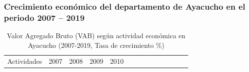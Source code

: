 \documentclass[
  jou,
  floatsintext,
  longtable,
  a4paper,
  nolmodern,
  notxfonts,
  notimes,
  12pt,
  colorlinks=true,linkcolor=blue,citecolor=blue,urlcolor=blue]{apa7}
\begin{document}
\subsubsection{Crecimiento económico del departamento de Ayacucho en el
periodo 2007 --
2019}\label{crecimiento-econuxf3mico-del-departamento-de-ayacucho-en-el-periodo-2007-2019}

\begin{ThreePartTable}

\begin{longtable}[]{@{}
  >{\raggedright\arraybackslash}p{}
  >{\raggedright\arraybackslash}p{}
  >{\raggedright\arraybackslash}p{}
  >{\raggedright\arraybackslash}p{}
  >{\raggedright\arraybackslash}p{}
  >{\raggedright\arraybackslash}p{}
  >{\raggedright\arraybackslash}p{}
  >{\raggedright\arraybackslash}p{}
  >{\raggedright\arraybackslash}p{}
  >{\raggedright\arraybackslash}p{}
  >{\raggedright\arraybackslash}p{}
  >{\raggedright\arraybackslash}p{}
  >{\raggedright\arraybackslash}p{}
  >{\raggedright\arraybackslash}p{}@{}}
\caption{Valor Agregado Bruto (VAB) según actividad económica en
Ayacucho (2007-2019, Tasa de crecimiento
\%)}\label{tbl-3}\tabularnewline
\toprule\noalign{}
\begin{minipage}[b]{\linewidth}\raggedright
Actividades
\end{minipage} & \begin{minipage}[b]{\linewidth}\raggedright
2007
\end{minipage} & \begin{minipage}[b]{\linewidth}\raggedright
2008
\end{minipage} & \begin{minipage}[b]{\linewidth}\raggedright
2009
\end{minipage} & \begin{minipage}[b]{\linewidth}\raggedright
2010
\end{minipage} & \begin{minipage}[b]{\linewidth}\raggedright

\end{minipage}
\end{longtable}
\end{ThreePartTable}
\end{document}
